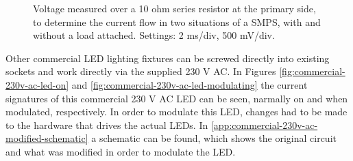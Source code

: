 \begin{figure}
	\centering     %

	\caption{Voltage measured over a 10 ohm series resistor at the primary side, to determine the current flow in two situations of a SMPS, with and without a load attached. Settings: 2 ms/div, 500 mV/div.}
\end{figure}



Other commercial LED lighting fixtures can be screwed directly into existing sockets and work directly via the supplied 230 V AC.
In Figures \ref{fig:commercial-230v-ac-led-on} and \ref{fig:commercial-230v-ac-led-modulating} the current signatures of this commercial 230 V AC LED can be seen, narmally on and when modulated, respectively.
In order to modulate this LED, changes had to be made to the hardware that drives the actual LEDs.
In \autoref{app:commercial-230v-ac-modified-schematic} a schematic can be found, which shows the original circuit and what was modified in order to modulate the LED.









